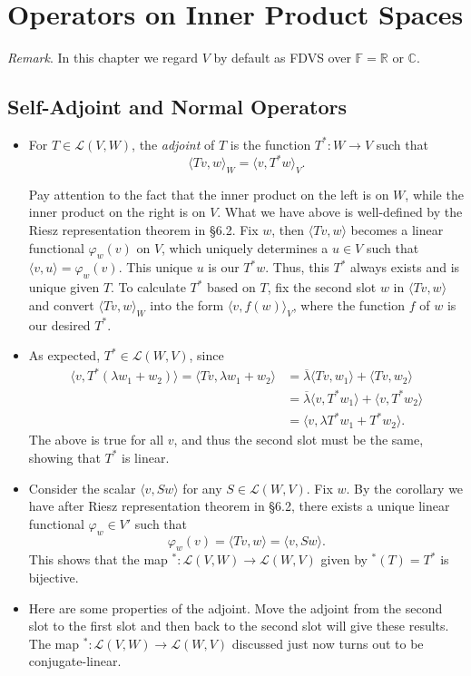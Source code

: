 \documentclass{article}
\newcommand{\R}{\mathbb{R}}
\newcommand{\C}{\mathbb{C}}
\newcommand{\F}{\mathbb{F}}
\newcommand{\conj}[1]{\overline{#1}}
\newcommand{\inp}[2]{\langle #1, #2 \rangle}
\newcommand{\LVW}{\mathcal{L}(V,W)}
\renewcommand{\phi}{\varphi}
\begin{document}
\section{Operators on Inner Product Spaces}
\textit{Remark}. In this chapter we regard $V$ by default as FDVS over $\F = \R$ or $\C$.
\subsection{Self-Adjoint and Normal Operators}
\begin{itemize}
    \item For $T \in \LVW$, the \textit{adjoint} of $T$ is the function $T^*: W \to V$ such that $$\inp{Tv}{w}_W = \inp{v}{T^*w}_V.$$
    
    Pay attention to the fact that the inner product on the left is on $W$, while the inner product on the right is on $V$. What we have above is well-defined by the Riesz representation theorem in \S6.2. Fix $w$, then $\inp{Tv}{w}$ becomes a linear functional $\phi_w(v)$ on $V$, which uniquely determines a $u \in V$ such that $\inp{v}{u} = \phi_w(v)$. This unique $u$ is our $T^*w$. Thus, this $T^*$ always exists and is unique given $T$. To calculate $T^*$ based on $T$, fix the second slot $w$ in $\inp{Tv}{w}$ and convert $\inp{Tv}{w}_W$ into the form $\inp{v}{f(w)}_V$, where the function $f$ of $w$ is our desired $T^*$.
    \item As expected, $T^* \in \mathcal{L}(W,V)$, since
    \begin{align*}
        \inp{v}{T^*(\lambda w_1 + w_2)} = \inp{Tv}{\lambda w_1 + w_2} & = \conj{\lambda}\inp{Tv}{w_1} + \inp{Tv}{w_2} \\ & = \conj{\lambda}\inp{v}{T^*w_1} + \inp{v}{T^*w_2} \\ & = \inp{v}{\lambda T^* w_1 + T^*w_2}.
    \end{align*}
    The above is true for all $v$, and thus the second slot must be the same, showing that $T^*$ is linear.
    \item Consider the scalar $\inp{v}{Sw}$ for any $S \in \mathcal{L}(W,V)$. Fix $w$. By the corollary we have after Riesz representation theorem in \S6.2, there exists a unique linear functional $\phi_w \in V'$ such that $$\phi_w(v) = \inp{Tv}{w} = \inp{v}{Sw}.$$ This shows that the map $^*: \LVW \to \mathcal{L}(W,V)$ given by $^*(T) = T^*$ is bijective.
    \item Here are some properties of the adjoint. Move the adjoint from the second slot to the first slot and then back to the second slot will give these results. The map $^*: \LVW \to \mathcal{L}(W,V)$ discussed just now turns out to be conjugate-linear.

\end{itemize}
\end{document}
